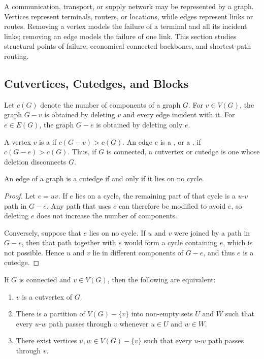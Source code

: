 A communication, transport, or supply network may be represented by a graph. Vertices represent terminals, routers, or locations, while edges represent links or routes. Removing a vertex models the failure of a terminal and all its incident links; removing an edge models the failure of one link. This section studies structural points of failure, economical connected backbones, and shortest-path routing.

\subsection{Cutvertices, Cutedges, and Blocks}\label{subsec:Blocks}

Let $c(G)$ denote the number of components of a graph $G$. For $v \in V(G)$, the graph $G - v$ is obtained by deleting $v$ and every edge incident with it. For $e \in E(G)$, the graph $G - e$ is obtained by deleting only $e$.

A vertex $v$ is a  if $c(G-v) > c(G)$. An edge $e$ is a , or a , if $c(G-e) > c(G)$. Thus, if $G$ is connected, a cutvertex or cutedge is one whose deletion disconnects $G$.

\begin{Theorem}\label{thm:CutedgeCycle}
An edge of a graph is a cutedge if and only if it lies on no cycle.
\end{Theorem}

\begin{proof}
Let $e = uv$. If $e$ lies on a cycle, the remaining part of that cycle is a $u$-$v$ path in $G - e$. Any path that uses $e$ can therefore be modified to avoid $e$, so deleting $e$ does not increase the number of components.

Conversely, suppose that $e$ lies on no cycle. If $u$ and $v$ were joined by a path in $G - e$, then that path together with $e$ would form a cycle containing $e$, which is not possible. Hence $u$ and $v$ lie in different components of $G - e$, and thus $e$ is a cutedge.
\end{proof}

\begin{Theorem}\label{thm:CutverChar}
If $G$ is connected and $v\in V(G)$, then the following are equivalent:
\begin{enumerate}[label=(\roman*)]
\item\label{it:CutverChar1} $v$ is a cutvertex of $G$.
\item\label{it:CutverChar2} There is a partition of $V(G) - \{v\}$ into non-empty sets $U$ and $W$ such that every $u$-$w$ path passes through $v$ whenever $u \in U$ and $w \in W$.
\item\label{it:CutverChar3} There exist vertices $u,w \in V(G) - \{v\}$ such that every $u$-$w$ path passes through $v$.
\end{enumerate}
\end{Theorem}

